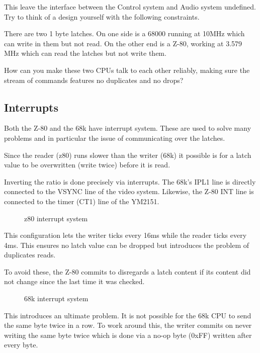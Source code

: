 This leave the interface between the Control system and Audio system undefined. Try to think of a design yourself with the following constraints.

There are two 1 byte latches. On one side is a 68000 running at 10MHz which can write in them but not read. On the other end is a Z-80, working at 3.579 MHz which can read the latches but not write them. 

How can you make these two CPUs talk to each other reliably, making sure the stream of commands features no duplicates and no drops?

\subsection{Interrupts}

Both the Z-80 and the 68k have interrupt system. These are used to solve many problems and in particular the issue of communicating over the latches.

Since the reader (z80) runs slower than the writer (68k) it possible is for a latch value to be overwritten (write twice) before it is read. 

Inverting the ratio is done precisely via interrupts. The 68k's IPL1 line is directly connected to the VSYNC line of the video system. Likewise, the Z-80 INT line is connected to the timer (CT1) line of the YM2151.

\begin{figure}[H]
\caption*{z80 interrupt system}
\end{figure}

This configuration lets the writer ticks every 16ms while the reader ticks every 4ms. This ensures no latch value can be dropped but introduces the problem of duplicates reads.

To avoid these, the Z-80 commits to disregards a latch content if its content did not change since the last time it was checked.

\begin{figure}[H]
\caption*{68k interrupt system}
\end{figure}

This introduces an ultimate problem. It is not possible for the 68k CPU to send the same byte twice in a row. To work around this, the writer commits on never writing the same byte twice which is done via a no-op byte (0xFF) written after every byte.




